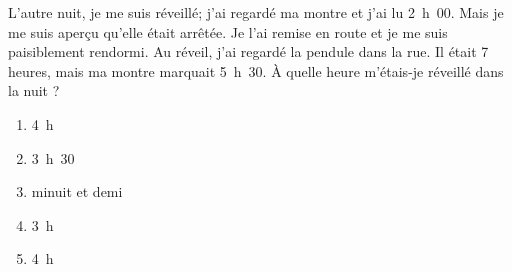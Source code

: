 L'autre nuit, je me suis réveillé; j'ai regardé ma montre et j'ai lu 2~h~00. Mais je me suis aperçu qu'elle était arrêtée. Je l'ai remise en route et je me suis paisiblement rendormi. Au réveil, j'ai regardé la pendule dans la rue. Il était 7 heures, mais ma montre marquait 5~h~30. \`A quelle heure m'étais-je réveillé dans la nuit ?
\begin{multicols}{5}
  \begin{enumerate}[A/]
  \item 4~h
  \item 3~h~30
  \item minuit et demi
  \item 3~h
  \item 4~h
  \end{enumerate}
\end{multicols}